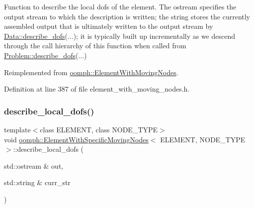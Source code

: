Function to describe the local dofs of the element. The ostream specifies the output stream to which the description is written; the string stores the currently assembled output that is ultimately written to the output stream by \hyperlink{classoomph_1_1Data_a2dae16e2dcff9a40029f834c83364df5}{Data\+::describe\+\_\+dofs}(...); it is typically built up incrementally as we descend through the call hierarchy of this function when called from \hyperlink{classoomph_1_1Problem_abc103804eb319ae0b3d43870cc3e1eaf}{Problem\+::describe\+\_\+dofs}(...) 



Reimplemented from \hyperlink{classoomph_1_1ElementWithMovingNodes_ab80f172afa65872255959c1af3fb7809}{oomph\+::\+Element\+With\+Moving\+Nodes}.



Definition at line 387 of file element\+\_\+with\+\_\+moving\+\_\+nodes.\+h.

\mbox{\label{classoomph_1_1ElementWithSpecificMovingNodes_a8f67562d3b274bb2f4f8926c4c9a186d}} 
\subsubsection{\texorpdfstring{describe\+\_\+local\+\_\+dofs()}{describe\_local\_dofs()}\hspace{0.1cm}{\footnotesize\ttfamily [2/2]}}
{\footnotesize\ttfamily template$<$class E\+L\+E\+M\+E\+NT, class N\+O\+D\+E\+\_\+\+T\+Y\+PE$>$ \\
void \hyperlink{classoomph_1_1ElementWithSpecificMovingNodes}{oomph\+::\+Element\+With\+Specific\+Moving\+Nodes}$<$ E\+L\+E\+M\+E\+NT, N\+O\+D\+E\+\_\+\+T\+Y\+PE $>$\+::describe\+\_\+local\+\_\+dofs (\begin{DoxyParamCaption}\item[{std\+::ostream \&}]{out,  }\item[{std\+::string \&}]{curr\+\_\+str }\end{DoxyParamCaption})\hspace{0.3cm}{\ttfamily [inline]}}



